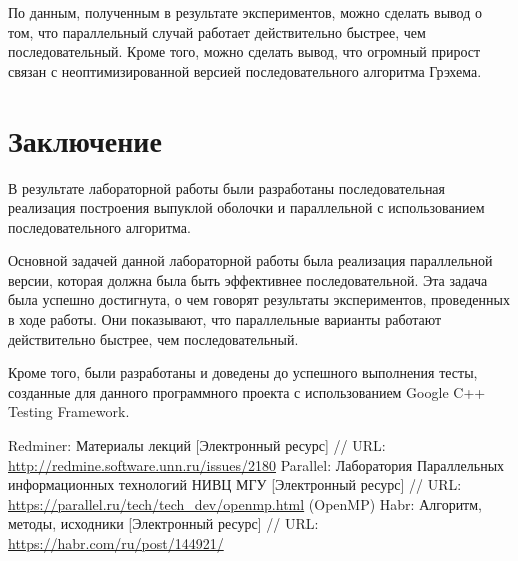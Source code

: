 \documentclass{report}
\begin{document}
\par По данным, полученным в результате экспериментов, можно сделать вывод о том, что параллельный случай работает действительно быстрее, чем последовательный. Кроме того, можно сделать вывод, что огромный прирост связан с неоптимизированной версией последовательного алгоритма Грэхема.
\newpage

\section*{Заключение}
В результате лабораторной работы были разработаны последовательная реализация построения выпуклой оболочки и параллельной с использованием последовательного алгоритма.
\par Основной задачей данной лабораторной работы была реализация параллельной версии, которая должна была быть эффективнее последовательной. Эта задача была успешно достигнута, о чем говорят результаты экспериментов, проведенных в ходе работы. Они показывают, что параллельные варианты работают действительно быстрее, чем последовательный.
\par Кроме того, были разработаны и доведены до успешного выполнения тесты, созданные для данного программного проекта с использованием Google C++ Testing Framework.
\newpage

\begin{thebibliography}{1}
 Redminer: Материалы лекций [Электронный ресурс] // URL: \url{http://redmine.software.unn.ru/issues/2180}
 Parallel: Лаборатория Параллельных информационных технологий НИВЦ МГУ [Электронный ресурс] // URL: \url {https://parallel.ru/tech/tech_dev/openmp.html} (OpenMP)
 Habr: Алгоритм, методы, исходники [Электронный ресурс] // URL: \url{https://habr.com/ru/post/144921/}
\end{thebibliography}
\newpage

\end{document}

